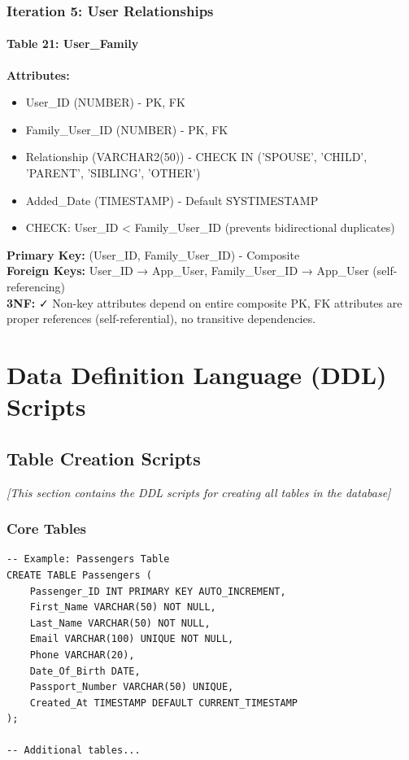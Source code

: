 \documentclass[12pt,a4paper,openany]{report}
\begin{document}
\subsubsection{Iteration 5: User Relationships}

\paragraph{Table 21: User\_Family}
\textbf{Attributes:} 
\begin{itemize}
    \item User\_ID (NUMBER) - PK, FK
    \item Family\_User\_ID (NUMBER) - PK, FK
    \item Relationship (VARCHAR2(50)) - CHECK IN ('SPOUSE', 'CHILD', 'PARENT', 'SIBLING', 'OTHER')
    \item Added\_Date (TIMESTAMP) - Default SYSTIMESTAMP
    \item CHECK: User\_ID < Family\_User\_ID (prevents bidirectional duplicates)
\end{itemize}
\textbf{Primary Key:} (User\_ID, Family\_User\_ID) - Composite\\
\textbf{Foreign Keys:} User\_ID → App\_User, Family\_User\_ID → App\_User (self-referencing)\\
\textbf{3NF:} ✓ Non-key attributes depend on entire composite PK, FK attributes are proper references (self-referential), no transitive dependencies.

\section{Data Definition Language (DDL) Scripts}

\subsection{Table Creation Scripts}

\textit{[This section contains the DDL scripts for creating all tables in the database]}

\subsubsection{Core Tables}

\begin{lstlisting}[caption={Sample DDL Script - Tables Creation}]
-- Example: Passengers Table
CREATE TABLE Passengers (
    Passenger_ID INT PRIMARY KEY AUTO_INCREMENT,
    First_Name VARCHAR(50) NOT NULL,
    Last_Name VARCHAR(50) NOT NULL,
    Email VARCHAR(100) UNIQUE NOT NULL,
    Phone VARCHAR(20),
    Date_Of_Birth DATE,
    Passport_Number VARCHAR(50) UNIQUE,
    Created_At TIMESTAMP DEFAULT CURRENT_TIMESTAMP
);

-- Additional tables...
\end{lstlisting}
\end{document}
